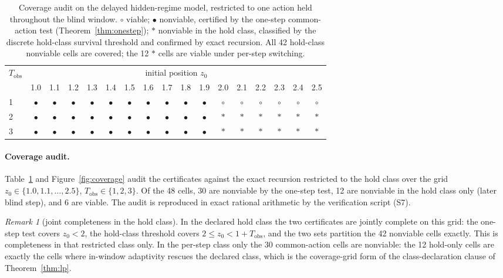 \documentclass[11pt,a4paper]{article}
\theoremstyle{plain}
\theoremstyle{definition}
\theoremstyle{remark}
\newtheorem{remark}[theorem]{Remark}
\newcommand{\Tobs}{T_{\mathrm{obs}}}
\begin{document}
\begin{table}[tb]
\centering\small
\setlength{\tabcolsep}{4.2pt}
\begin{tabular}{@{}lcccccccccccccccc@{}}
\toprule
$\Tobs$ & \multicolumn{16}{c}{initial position $z_0$}\\
\cmidrule(lr){2-17}
 & 1.0 & 1.1 & 1.2 & 1.3 & 1.4 & 1.5 & 1.6 & 1.7 & 1.8 & 1.9 & 2.0 & 2.1 & 2.2 & 2.3 & 2.4 & 2.5\\
\midrule
1 & $\bullet$ & $\bullet$ & $\bullet$ & $\bullet$ & $\bullet$ & $\bullet$ & $\bullet$ & $\bullet$ & $\bullet$ & $\bullet$ & $\circ$ & $\circ$ & $\circ$ & $\circ$ & $\circ$ & $\circ$\\
2 & $\bullet$ & $\bullet$ & $\bullet$ & $\bullet$ & $\bullet$ & $\bullet$ & $\bullet$ & $\bullet$ & $\bullet$ & $\bullet$ & $\ast$ & $\ast$ & $\ast$ & $\ast$ & $\ast$ & $\ast$\\
3 & $\bullet$ & $\bullet$ & $\bullet$ & $\bullet$ & $\bullet$ & $\bullet$ & $\bullet$ & $\bullet$ & $\bullet$ & $\bullet$ & $\ast$ & $\ast$ & $\ast$ & $\ast$ & $\ast$ & $\ast$\\
\bottomrule
\end{tabular}
\caption{Coverage audit on the delayed hidden-regime model, restricted to one action held throughout the blind window. $\circ$ viable; $\bullet$ nonviable, certified by the one-step common-action test (Theorem~\ref{thm:onestep}); $\ast$ nonviable in the hold class, classified by the discrete hold-class survival threshold and confirmed by exact recursion. All 42 hold-class nonviable cells are covered; the 12 $\ast$ cells are viable under per-step switching.}
\label{tab:coverage}
\end{table}

\paragraph{Coverage audit.} Table~\ref{tab:coverage} and Figure~\ref{fig:coverage} audit the certificates against the exact recursion restricted to the hold class over the grid $z_0\in\{1.0,1.1,\dots,2.5\}$, $\Tobs\in\{1,2,3\}$. Of the 48 cells, 30 are nonviable by the one-step test, 12 are nonviable in the hold class only (later blind step), and 6 are viable. The audit is reproduced in exact rational arithmetic by the verification script (S7).

\begin{remark}[joint completeness in the hold class]\label{rem:coverage}
In the declared hold class the two certificates are jointly complete on this grid: the one-step test covers $z_0<2$, the hold-class threshold covers $2\le z_0<1+\Tobs$, and the two sets partition the 42 nonviable cells exactly. This is completeness in that restricted class only. In the per-step class only the 30 common-action cells are nonviable: the 12 hold-only cells are exactly the cells where in-window adaptivity rescues the declared class, which is the coverage-grid form of the class-declaration clause of Theorem~\ref{thm:lp}.
\end{remark}
\end{document}

